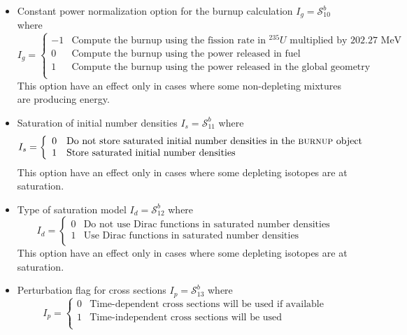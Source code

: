 \begin{itemize}
\item Constant power normalization option for the burnup calculation
$I_{g}=\mathcal{S}^{b}_{10}$ where
\vskip -0.8cm
\begin{displaymath}
I_{g} = \left\{
\begin{array}{rl}
 -1 & \textrm{Compute the burnup using the fission rate in $^{235}U$ multiplied by 202.27 MeV} \\
 0 & \textrm{Compute the burnup using the power released in fuel} \\
 1 & \textrm{Compute the burnup using the power released in the global geometry} \\
\end{array} \right.
\end{displaymath}
This option have an effect only in cases
where some non-depleting mixtures are producing energy.

\item Saturation of initial number densities $I_{s}=\mathcal{S}^{b}_{11}$ where
\vskip -0.8cm
\begin{displaymath}
I_{s} = \left\{
\begin{array}{rl}
 0 & \textrm{Do not store saturated initial number densities in the {\sc burnup}
 object} \\
 1 & \textrm{Store saturated initial number densities} \\
\end{array} \right.
\end{displaymath}
This option have an effect only in cases where some depleting isotopes are
at saturation.

\item Type of saturation model $I_{d}=\mathcal{S}^{b}_{12}$ where
\vskip -0.8cm
\begin{displaymath}
I_{d} = \left\{
\begin{array}{rl}
 0 & \textrm{Do not use Dirac functions in saturated number densities} \\
 1 & \textrm{Use Dirac functions in saturated number densities} \\
\end{array} \right.
\end{displaymath}
This option have an effect only in cases where some depleting isotopes are
at saturation.

\item Perturbation flag for cross sections $I_{p}=\mathcal{S}^{b}_{13}$ where
\vskip -0.8cm
\begin{displaymath}
I_{p} = \left\{
\begin{array}{rl}
 0 & \textrm{Time-dependent cross sections will be used if available} \\
 1 & \textrm{Time-independent cross sections will be used} \\
\end{array} \right.
\end{displaymath}


\end{itemize}
